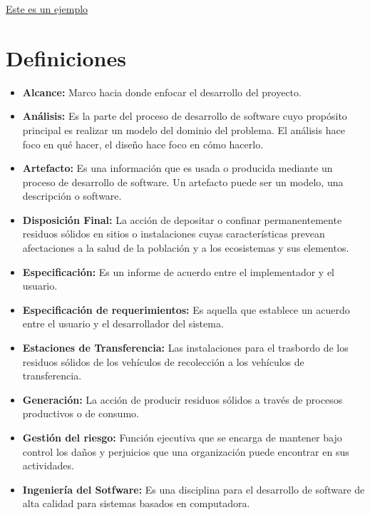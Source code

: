 \label{cap:glosario}


\hyperlink{capitalHumano}{Este es un ejemplo}
\section{Definiciones}
    \begin{itemize} 
        \item \textbf{Alcance:}  Marco hacia donde enfocar el desarrollo del proyecto.
        \item \textbf{Análisis:} Es la parte del proceso de desarrollo de software cuyo propósito principal es realizar un modelo del dominio del problema. El análisis hace foco en qué hacer, el diseño hace foco en cómo hacerlo.
        \item \textbf{Artefacto:} Es una información que es usada o producida mediante un proceso de desarrollo de software. Un artefacto puede ser un modelo, una descripción o software.
        \item \textbf{Disposición Final:} La acción de depositar o confinar permanentemente residuos sólidos en sitios o instalaciones cuyas características  prevean afectaciones a la salud de la población y a los ecosistemas y sus elementos.
        \item \textbf{Especificación:} Es un informe de acuerdo entre el implementador y el usuario.
        \item \textbf{Especificación de requerimientos:} Es aquella que establece un acuerdo entre el usuario y el desarrollador del sistema.
        \item \textbf{Estaciones de Transferencia:} Las instalaciones para el trasbordo de los residuos sólidos de los vehículos de recolección a los vehículos de transferencia.
        \item \textbf{Generación:} La acción de producir residuos sólidos a través de procesos productivos o de consumo.
        \item \textbf{Gestión del riesgo:} Función ejecutiva que se encarga de mantener bajo control los daños y perjuicios que una organización puede encontrar en sus actividades.
        \item \textbf{Ingeniería del Sotfware:} Es una disciplina para el desarrollo de software de alta calidad para sistemas basados en computadora.

\end{itemize}

